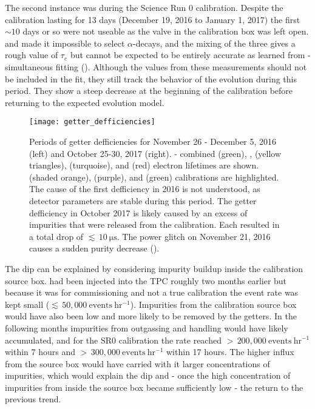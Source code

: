 The second instance was during the Science Run 0  calibration.  Despite the calibration lasting for 13 days
(December 19, 2016 to January 1, 2017) the first ${\sim} 10$ days or
so were not useable as the valve in the calibration box  was left
open.   and  made it impossible to select  $\alpha$-decays, and the mixing of the three gives a
rough
value of $\tau_e$ but cannot be expected to be entirely accurate as learned from \rnbkg- simultaneous fitting
().  Although the values from these measurements should not be included in the
fit, they still track the behavior of the evolution during this period.  They show a steep decrease at the beginning of the calibration
before returning to the expected evolution model.

\begin{figure}
\centering
\texttt{[image: getter\_defficiencies]}
\caption{Periods of getter defficiencies for November 26 - December 5, 2016 (left) and October 25-30, 2017 (right). 
- combined (green), ,
(yellow triangles),  (turquoise), and  (red) electron lifetimes are shown.  \metakr (shaded orange),
 (purple), and \ambe (green) calibrations are highlighted.  The cause of the first defficiency in 2016 is not understood, as
detector parameters are stable during this period.  The getter defficiency in October 2017 is likely caused by an excess of impurities
that were released from the  calibration.  Each resulted in a total drop of ${\lesssim}\, 10\ \mathrm{\mu s}$.  The power
glitch on November 21, 2016 causes a sudden purity decrease ().}
\label{fig:electron_lifetime_model_detector_effects_getter_getter_defficiencies}
\end{figure}

The dip can be explained by considering impurity buildup inside the calibration source box.   had been injected into the TPC
roughly two months earlier but because it was for commissioning and not a true calibration the event rate was kept small
(${\lesssim}\, 50,000\ \mathrm{events\ hr^{-1}}$).  Impurities from the calibration source box would have also been low and more likely to be
removed by the getters.  In the following months
impurities from outgassing and handling would have likely accumulated, and for the SR0 calibration the rate reached
${>}\, 200,000\ \mathrm{events\ hr^{-1}}$ within 7 hours and ${>}\, 300,000\ \mathrm{events\ hr^{-1}}$ within 17 hours.  The higher influx
from the source box would have carried with it larger concentrations of impurities, which would explain the
dip and - once the high concentration of impurities from inside the source box became sufficiently low - the return to the previous
trend.

